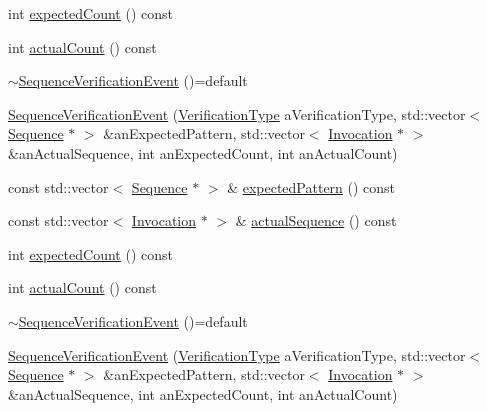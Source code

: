 \begin{DoxyCompactItemize}
\item 
int \mbox{\hyperlink{structfakeit_1_1SequenceVerificationEvent_ad0970b6b1b3b3d122e0494e95c6a00eb}{expected\+Count}} () const
\item 
int \mbox{\hyperlink{structfakeit_1_1SequenceVerificationEvent_a4f7daa947cca317c30e74ee66540d3b9}{actual\+Count}} () const
\item 
\mbox{\hyperlink{structfakeit_1_1SequenceVerificationEvent_a8f8e45c2407802e200befa82790c5e13}{$\sim$\+Sequence\+Verification\+Event}} ()=default
\item 
\mbox{\hyperlink{structfakeit_1_1SequenceVerificationEvent_ab0842bb20a84757c265ecdee00f41c91}{Sequence\+Verification\+Event}} (\mbox{\hyperlink{namespacefakeit_a9df22520dd60badb149c1d1d2518b253}{Verification\+Type}} a\+Verification\+Type, std\+::vector$<$ \mbox{\hyperlink{classfakeit_1_1Sequence}{Sequence}} $\ast$ $>$ \&an\+Expected\+Pattern, std\+::vector$<$ \mbox{\hyperlink{structfakeit_1_1Invocation}{Invocation}} $\ast$ $>$ \&an\+Actual\+Sequence, int an\+Expected\+Count, int an\+Actual\+Count)
\item 
const std\+::vector$<$ \mbox{\hyperlink{classfakeit_1_1Sequence}{Sequence}} $\ast$ $>$ \& \mbox{\hyperlink{structfakeit_1_1SequenceVerificationEvent_a2d3fb35082acdadfe2be2a4d69c94189}{expected\+Pattern}} () const
\item 
const std\+::vector$<$ \mbox{\hyperlink{structfakeit_1_1Invocation}{Invocation}} $\ast$ $>$ \& \mbox{\hyperlink{structfakeit_1_1SequenceVerificationEvent_aecdc4dac839dc16a96ee85b0d0297bed}{actual\+Sequence}} () const
\item 
int \mbox{\hyperlink{structfakeit_1_1SequenceVerificationEvent_ad0970b6b1b3b3d122e0494e95c6a00eb}{expected\+Count}} () const
\item 
int \mbox{\hyperlink{structfakeit_1_1SequenceVerificationEvent_a4f7daa947cca317c30e74ee66540d3b9}{actual\+Count}} () const
\item 
\mbox{\hyperlink{structfakeit_1_1SequenceVerificationEvent_a8f8e45c2407802e200befa82790c5e13}{$\sim$\+Sequence\+Verification\+Event}} ()=default
\item 
\mbox{\hyperlink{structfakeit_1_1SequenceVerificationEvent_ab0842bb20a84757c265ecdee00f41c91}{Sequence\+Verification\+Event}} (\mbox{\hyperlink{namespacefakeit_a9df22520dd60badb149c1d1d2518b253}{Verification\+Type}} a\+Verification\+Type, std\+::vector$<$ \mbox{\hyperlink{classfakeit_1_1Sequence}{Sequence}} $\ast$ $>$ \&an\+Expected\+Pattern, std\+::vector$<$ \mbox{\hyperlink{structfakeit_1_1Invocation}{Invocation}} $\ast$ $>$ \&an\+Actual\+Sequence, int an\+Expected\+Count, int an\+Actual\+Count)

\end{DoxyCompactItemize}

